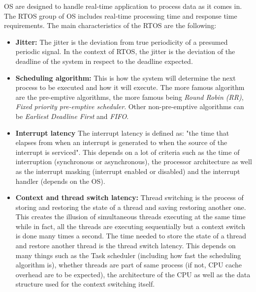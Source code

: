 OS are designed to handle real-time application to process data as it comes in. The RTOS group of OS includes real-time processing time and response time requirements.
The main characteristics of the RTOS are the following:
\begin{itemize}
\item\textbf{Jitter:} The jitter is the deviation from true periodicity of a presumed periodic signal. In the context of RTOS, the jitter is the deviation of the deadline of the system in respect to the deadline expected\cite{chibios_jitter}.
\item\textbf{Scheduling algorithm:} This is how the system will determine the next process to be executed and how it will execute. The more famous algorithm are the pre-emptive algorithms, the more famous being \textit{Round Robin (RR)}, \textit{Fixed priority pre-emptive scheduler}. Other non-pre-emptive algorithms can be \textit{Earliest Deadline First} and \textit{FIFO}.
\item\textbf{Interrupt latency} The interrupt latency is defined as: "the time that elapses from when an interrupt is generated to when the source of the interrupt is serviced". This depends on a lot of criteria such as the time of interruption (synchronous or asynchronous), the processor architecture as well as the interrupt masking (interrupt enabled or disabled) and the interrupt handler (depends on the OS).
\item\textbf{Context and thread switch latency:} Thread switching is the process of storing and restoring the state of a thread and saving restoring another one. This creates the illusion of simultaneous threads executing at the same time while in fact, all the threads are executing sequentially but a context switch is done many times a second. The time needed to store the state of a thread and restore another thread is the thread switch latency. This depends on many things such as the Task scheduler (including how fast the scheduling algorithm is), whether threads are part of same process (if not, CPU cache overhead are to be expected), the architecture of the CPU as well as the data structure used for the context switching itself.
\end{itemize}


